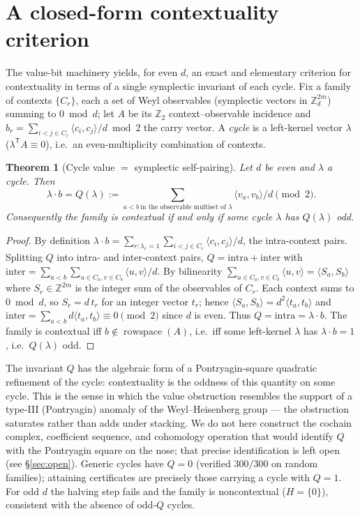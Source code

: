 \documentclass[11pt]{article}
\newtheorem{theorem}{Theorem}
\theoremstyle{remark}
\newcommand{\Z}{\mathbb{Z}}
\newcommand{\ip}[2]{\langle #1,#2\rangle}
\DeclareMathOperator{\rowspace}{rowspace}
\begin{document}
\section{A closed-form contextuality criterion}
The value-bit machinery yields, for even $d$, an exact and elementary criterion for contextuality in
terms of a single symplectic invariant of each cycle. Fix a family of contexts $\{C_r\}$, each a set
of Weyl observables (symplectic vectors in $\Z_d^{2m}$) summing to $0\bmod d$; let $A$ be its $\Z_2$
context--observable incidence and $b_r=\sum_{i<j\in C_r}\ip{c_i}{c_j}/d\bmod 2$ the carry vector. A
\emph{cycle} is a left-kernel vector $\lambda$ ($\lambda^{\mathsf T}A\equiv 0$), i.e.\ an
even-multiplicity combination of contexts.
\begin{theorem}[Cycle value $=$ symplectic self-pairing]\label{thm:cycle}
Let $d$ be even and $\lambda$ a cycle. Then
\[
\lambda\cdot b=Q(\lambda):=\sum_{a<b\ \text{in the observable multiset of }\lambda}\ip{v_a}{v_b}/d
\pmod 2.
\]
Consequently the family is contextual if and only if some cycle $\lambda$ has $Q(\lambda)$ odd.
\end{theorem}
\begin{proof}
By definition $\lambda\cdot b=\sum_{r:\lambda_r=1}\sum_{i<j\in C_r}\ip{c_i}{c_j}/d$, the intra-context
pairs. Splitting $Q$ into intra- and inter-context pairs, $Q=\text{intra}+\text{inter}$ with
$\text{inter}=\sum_{a<b}\sum_{u\in C_a,v\in C_b}\ip{u}{v}/d$. By bilinearity
$\sum_{u\in C_a,v\in C_b}\ip{u}{v}=\ip{S_a}{S_b}$ where $S_r\in\Z^{2m}$ is the integer sum of the
observables of $C_r$. Each context sums to $0\bmod d$, so $S_r=d\,t_r$ for an integer vector $t_r$;
hence $\ip{S_a}{S_b}=d^2\ip{t_a}{t_b}$ and $\text{inter}=\sum_{a<b}d\ip{t_a}{t_b}\equiv 0\pmod 2$ since
$d$ is even. Thus $Q=\text{intra}=\lambda\cdot b$. The family is contextual iff
$b\notin\rowspace(A)$, i.e.\ iff some left-kernel $\lambda$ has $\lambda\cdot b=1$, i.e.\ $Q(\lambda)$
odd.
\end{proof}
The invariant $Q$ has the algebraic form of a Pontryagin-square quadratic refinement of the cycle:
contextuality is the oddness of this quantity on some cycle. This is the sense in which the value
obstruction resembles the support of a type-III (Pontryagin) anomaly of the Weyl--Heisenberg group ---
the obstruction saturates rather than adds under stacking. We do not here construct the cochain
complex, coefficient sequence, and cohomology operation that would identify $Q$ with the Pontryagin
square on the nose; that precise identification is left open (see \S\ref{sec:open}). Generic cycles have $Q=0$ (verified $300/300$ on random families); attaining
certificates are precisely those carrying a cycle with $Q=1$. For odd $d$ the halving step fails and
the family is noncontextual ($H=\{0\}$), consistent with the absence of odd-$Q$ cycles.
\end{document}
